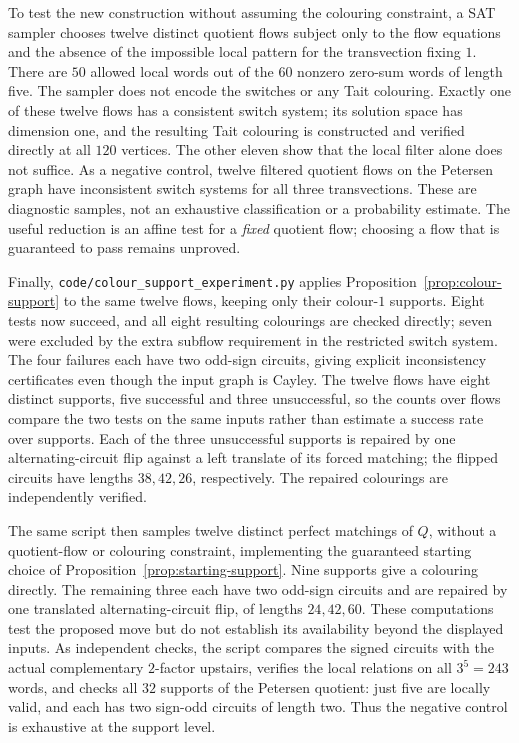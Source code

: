 \documentclass[11pt,a4paper]{article}
\theoremstyle{definition}
\theoremstyle{remark}
\begin{document}
To test the new construction without assuming the colouring constraint, a SAT sampler chooses twelve distinct quotient flows subject only to the flow equations and the absence of the impossible local pattern for the transvection fixing $1$.  There are $50$ allowed local words out of the $60$ nonzero zero-sum words of length five.  The sampler does not encode the switches or any Tait colouring.  Exactly one of these twelve flows has a consistent switch system; its solution space has dimension one, and the resulting Tait colouring is constructed and verified directly at all $120$ vertices.  The other eleven show that the local filter alone does not suffice.  As a negative control, twelve filtered quotient flows on the Petersen graph have inconsistent switch systems for all three transvections.  These are diagnostic samples, not an exhaustive classification or a probability estimate.  The useful reduction is an affine test for a \emph{fixed} quotient flow; choosing a flow that is guaranteed to pass remains unproved.

Finally, \nolinkurl{code/colour_support_experiment.py} applies Proposition~\ref{prop:colour-support} to the same twelve flows, keeping only their colour-$1$ supports.  Eight tests now succeed, and all eight resulting colourings are checked directly; seven were excluded by the extra subflow requirement in the restricted switch system.  The four failures each have two odd-sign circuits, giving explicit inconsistency certificates even though the input graph is Cayley.  The twelve flows have eight distinct supports, five successful and three unsuccessful, so the counts over flows compare the two tests on the same inputs rather than estimate a success rate over supports.  Each of the three unsuccessful supports is repaired by one alternating-circuit flip against a left translate of its forced matching; the flipped circuits have lengths $38,42,26$, respectively.  The repaired colourings are independently verified.

The same script then samples twelve distinct perfect matchings of $Q$, without a quotient-flow or colouring constraint, implementing the guaranteed starting choice of Proposition~\ref{prop:starting-support}.  Nine supports give a colouring directly.  The remaining three each have two odd-sign circuits and are repaired by one translated alternating-circuit flip, of lengths $24,42,60$.  These computations test the proposed move but do not establish its availability beyond the displayed inputs.  As independent checks, the script compares the signed circuits with the actual complementary $2$-factor upstairs, verifies the local relations on all $3^5=243$ words, and checks all $32$ supports of the Petersen quotient: just five are locally valid, and each has two sign-odd circuits of length two.  Thus the negative control is exhaustive at the support level.
\end{document}
